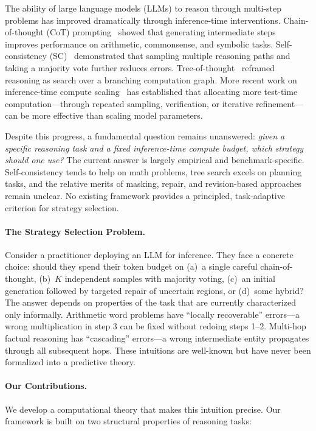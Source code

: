 \documentclass{article}
\begin{document}
The ability of large language models (LLMs) to reason through multi-step problems has improved dramatically through inference-time interventions. Chain-of-thought (CoT) prompting~\citep{wei2022chain} showed that generating intermediate steps improves performance on arithmetic, commonsense, and symbolic tasks. Self-consistency (SC)~\citep{wang2022selfconsistency} demonstrated that sampling multiple reasoning paths and taking a majority vote further reduces errors. Tree-of-thought~\citep{yao2023tree} reframed reasoning as search over a branching computation graph. More recent work on inference-time compute scaling~\citep{snell2024scaling, brown2024large, wu2024empirical} has established that allocating more test-time computation---through repeated sampling, verification, or iterative refinement---can be more effective than scaling model parameters.

Despite this progress, a fundamental question remains unanswered: \emph{given a specific reasoning task and a fixed inference-time compute budget, which strategy should one use?} The current answer is largely empirical and benchmark-specific. Self-consistency tends to help on math problems, tree search excels on planning tasks, and the relative merits of masking, repair, and revision-based approaches remain unclear. No existing framework provides a principled, task-adaptive criterion for strategy selection.

\paragraph{The Strategy Selection Problem.} Consider a practitioner deploying an LLM for inference. They face a concrete choice: should they spend their token budget on (a)~a single careful chain-of-thought, (b)~$K$ independent samples with majority voting, (c)~an initial generation followed by targeted repair of uncertain regions, or (d)~some hybrid? The answer depends on properties of the task that are currently characterized only informally. Arithmetic word problems have ``locally recoverable'' errors---a wrong multiplication in step 3 can be fixed without redoing steps 1--2. Multi-hop factual reasoning has ``cascading'' errors---a wrong intermediate entity propagates through all subsequent hops. These intuitions are well-known but have never been formalized into a predictive theory.

\paragraph{Our Contributions.} We develop a computational theory that makes this intuition precise. Our framework is built on two structural properties of reasoning tasks:
\end{document}
